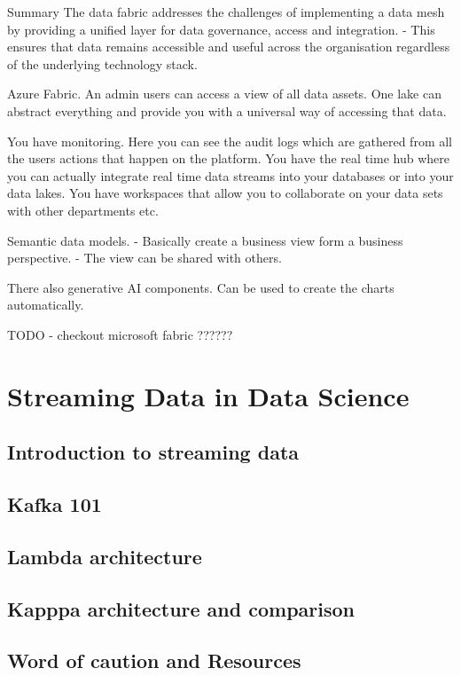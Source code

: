 \documentclass[a4paper, 11pt]{article}
\begin{document}
    Summary
    The data fabric addresses the challenges of implementing a data mesh by providing a unified layer for data governance, access and integration.
    - This ensures that data remains accessible and useful across the organisation regardless of the underlying technology stack.

    Azure Fabric.
    An admin users can access a view of all data assets.
    One lake can abstract everything and provide you with a universal way of accessing that data.

    You have monitoring.
    Here you can see the audit logs which are gathered from all the users actions that happen on the platform.
    You have the real time hub where you can actually integrate real time data streams into your databases or into your data lakes.
    You have workspaces that allow you to collaborate on your data sets with other departments etc.

    Semantic data models.
    - Basically create a business view form a business perspective.
    - The view can be shared with others.

    There also generative AI components.
    Can be used to create the charts automatically.

    TODO - checkout microsoft fabric ??????

    \section{Streaming Data in Data Science}

    \subsection{Introduction to streaming data}
    
    \subsection{Kafka 101} %
    
    \subsection{Lambda architecture}
    
    \subsection{Kapppa architecture and comparison}
    
    \subsection{Word of caution and Resources}
\end{document}
